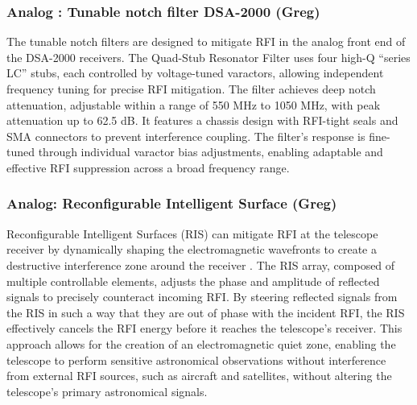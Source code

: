 \subsubsection{Analog : Tunable notch filter DSA-2000 (Greg)}

The tunable notch filters are designed to mitigate RFI in the analog front end of the DSA-2000 receivers. The Quad-Stub Resonator Filter uses four high-Q “series LC” stubs, each controlled by voltage-tuned varactors, allowing independent frequency tuning for precise RFI mitigation. The filter achieves deep notch attenuation, adjustable within a range of 550 MHz to 1050 MHz, with peak attenuation up to 62.5 dB. It features a chassis design with RFI-tight seals and SMA connectors to prevent interference coupling. The filter's response is fine-tuned through individual varactor bias adjustments, enabling adaptable and effective RFI suppression across a broad frequency range.

\subsubsection{Analog: Reconfigurable Intelligent Surface (Greg)}

Reconfigurable Intelligent Surfaces (RIS) can mitigate RFI at the telescope receiver by dynamically shaping the electromagnetic wavefronts to create a destructive interference zone around the receiver \cite{zou2022scisrs,wei2024ris,wei2023multistage}. The RIS array, composed of multiple controllable elements, adjusts the phase and amplitude of reflected signals to precisely counteract incoming RFI. By steering reflected signals from the RIS in such a way that they are out of phase with the incident RFI, the RIS effectively cancels the RFI energy before it reaches the telescope’s receiver. This approach allows for the creation of an electromagnetic quiet zone, enabling the telescope to perform sensitive astronomical observations without interference from external RFI sources, such as aircraft and satellites, without altering the telescope’s primary astronomical signals.

